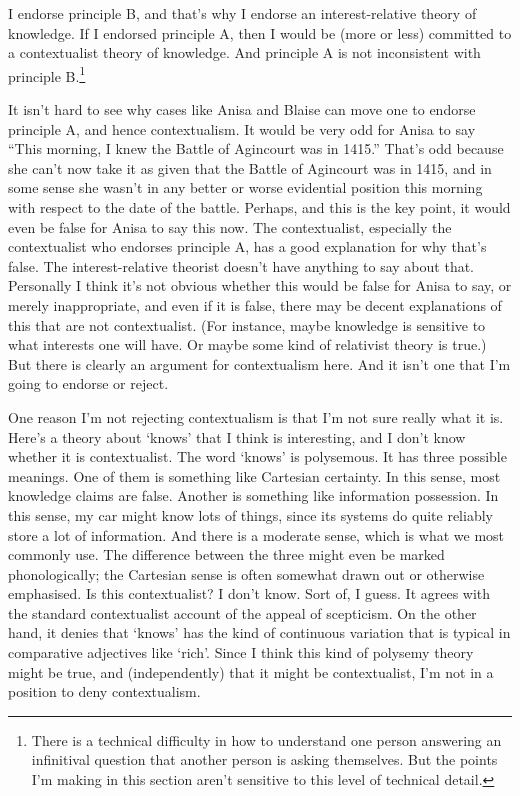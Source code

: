 \documentclass[
  12pt,
  letterpaper,
]{scrbook}
\begin{document}
I endorse principle B, and that's why I endorse an interest-relative
theory of knowledge. If I endorsed principle A, then I would be (more or
less) committed to a contextualist theory of knowledge. And principle A
is not inconsistent with principle B.\footnote{There is a technical
  difficulty in how to understand one person answering an infinitival
  question that another person is asking themselves. But the points I'm
  making in this section aren't sensitive to this level of technical
  detail.}

It isn't hard to see why cases like Anisa and Blaise can move one to
endorse principle A, and hence contextualism. It would be very odd for
Anisa to say ``This morning, I knew the Battle of Agincourt was in
1415.'' That's odd because she can't now take it as given that the
Battle of Agincourt was in 1415, and in some sense she wasn't in any
better or worse evidential position this morning with respect to the
date of the battle. Perhaps, and this is the key point, it would even be
false for Anisa to say this now. The contextualist, especially the
contextualist who endorses principle A, has a good explanation for why
that's false. The interest-relative theorist doesn't have anything to
say about that. Personally I think it's not obvious whether this would
be false for Anisa to say, or merely inappropriate, and even if it is
false, there may be decent explanations of this that are not
contextualist. (For instance, maybe knowledge is sensitive to what
interests one will have. Or maybe some kind of relativist theory is
true.) But there is clearly an argument for contextualism here. And it
isn't one that I'm going to endorse or reject.

One reason I'm not rejecting contextualism is that I'm not sure really
what it is. Here's a theory about `knows' that I think is interesting,
and I don't know whether it is contextualist. The word `knows' is
polysemous. It has three possible meanings. One of them is something
like Cartesian certainty. In this sense, most knowledge claims are
false. Another is something like information possession. In this sense,
my car might know lots of things, since its systems do quite reliably
store a lot of information. And there is a moderate sense, which is what
we most commonly use. The difference between the three might even be
marked phonologically; the Cartesian sense is often somewhat drawn out
or otherwise emphasised. Is this contextualist? I don't know. Sort of, I
guess. It agrees with the standard contextualist account of the appeal
of scepticism. On the other hand, it denies that `knows' has the kind of
continuous variation that is typical in comparative adjectives like
`rich'. Since I think this kind of polysemy theory might be true, and
(independently) that it might be contextualist, I'm not in a position to
deny contextualism.
\end{document}
